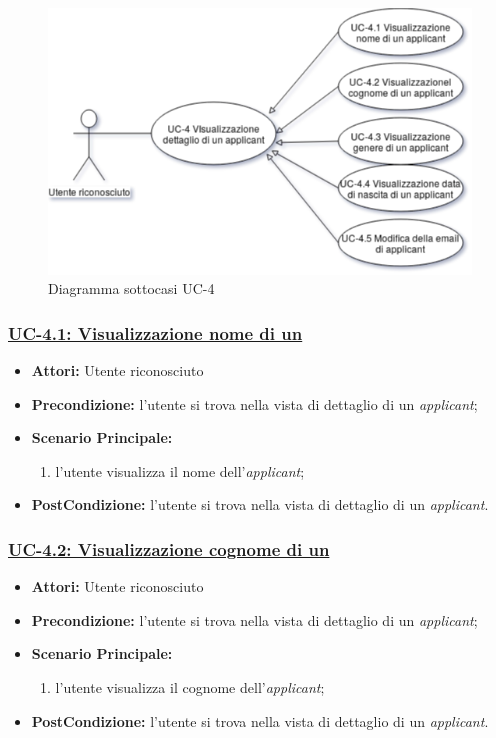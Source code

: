 \begin{figure}[!h] 
	\centering 
	\includegraphics[width=1\columnwidth]{immagini/usecase/UC4} 
	\caption{Diagramma sottocasi UC-4}
	\label{figura:uc-4}
\end{figure}

\subsubsection{\underline{UC-4.1: Visualizzazione nome di un \applicant}}
\begin{itemize}
\item \textbf{Attori:} Utente riconosciuto
\item \textbf{Precondizione:} l'utente si trova nella vista di dettaglio di un \textit{applicant};
\item \textbf{Scenario Principale:}
\begin{enumerate} 
	\item l'utente visualizza il nome dell'\textit{applicant};
\end{enumerate}
\item \textbf{PostCondizione:} l'utente si trova nella vista di dettaglio di un \textit{applicant}.
\end{itemize}

\subsubsection{\underline{UC-4.2: Visualizzazione cognome di un \applicant}}
\begin{itemize}
	\item \textbf{Attori:} Utente riconosciuto
	\item \textbf{Precondizione:} l'utente si trova nella vista di dettaglio di un \textit{applicant};
	\item \textbf{Scenario Principale:}
	\begin{enumerate} 
		\item l'utente visualizza il cognome dell'\textit{applicant};
	\end{enumerate}
	\item \textbf{PostCondizione:} l'utente si trova nella vista di dettaglio di un \textit{applicant}.
\end{itemize}

